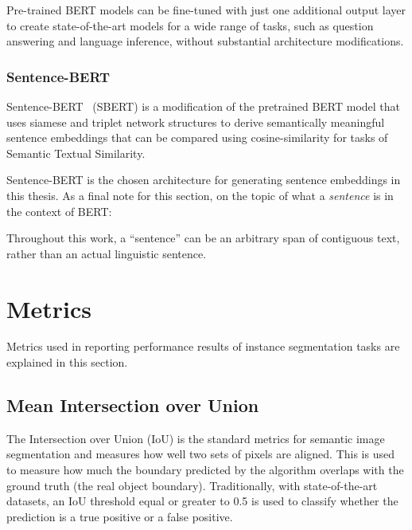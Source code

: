 \documentclass[oneside, english, bibtex]{kththesis}
\begin{document}
Pre-trained BERT models can be fine-tuned with just one additional output layer to create state-of-the-art models for a wide range of tasks, such as question answering and language inference, without substantial architecture modifications.

\subsubsection{Sentence-BERT}

Sentence-BERT~\cite{reimers-2019-sentence-bert, reimers-2020-multilingual-sentence-bert} (SBERT) is a modification of the pretrained BERT model that uses siamese and triplet network structures to derive semantically meaningful sentence embeddings that can be compared using cosine-similarity for tasks of Semantic Textual Similarity. 

Sentence-BERT is the chosen architecture for generating sentence embeddings in this thesis. As a final note for this section, on the topic of what a \textit{sentence} is in the context of BERT:


\begin{displayquote}
Throughout this work, a “sentence” can be an arbitrary span of contiguous text, rather than an actual linguistic sentence.~\cite{devlin2018bert}
\end{displayquote}



\clearpage

\section{Metrics}

Metrics used in reporting performance results of instance segmentation tasks are explained in this section.

\subsection{Mean Intersection over Union}

The Intersection over Union (IoU) is the standard metrics for semantic image segmentation and measures how well two sets of pixels are aligned. This is used to measure how much the boundary predicted by the algorithm overlaps with the ground truth (the real object boundary). Traditionally, with state-of-the-art datasets, an IoU threshold equal or greater to 0.5 is used to classify whether the prediction is a true positive or a false positive.
\end{document}

